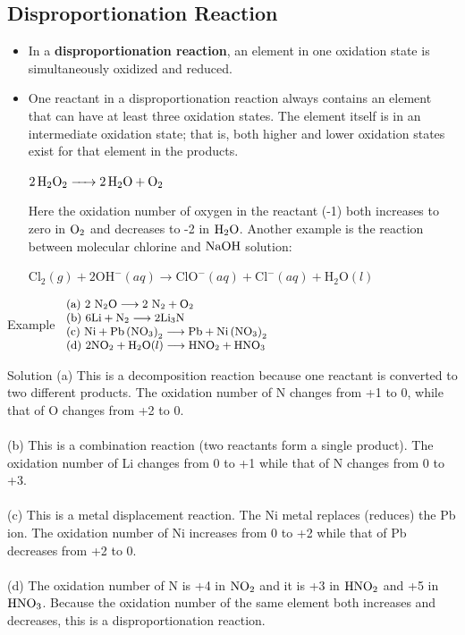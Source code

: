 \documentclass[a4paper,12pt,twocolumn]{article}
\begin{document}
\subsection{Disproportionation Reaction}
\begin{itemize}
\item In a \textbf{disproportionation reaction}, an element in one oxidation state is simultaneously oxidized and reduced.
\item One reactant in a disproportionation reaction always contains an element that can have at least three oxidation states. The element itself is in an intermediate oxidation state; that is, both higher and lower oxidation states exist for that element in the products.

\begin{Box1}{}
$\ce{2H2O2 -> 2H2O + O2}$
\end{Box1}
Here the oxidation number of oxygen in the reactant (-1) both increases to zero in
$\ce{O2}$ and decreases to -2 in $\ce{H2O}$. Another example is the reaction between molecular chlorine and $\ce{NaOH}$ solution:
\begin{Box1}{}
$\mathrm{Cl}_{2}(g)+2 \mathrm{OH}^{-}(a q) \longrightarrow \mathrm{ClO}^{-}(a q)+\mathrm{Cl}^{-}(a q)+\mathrm{H}_{2} \mathrm{O}(l)$
\end{Box1}
\end{itemize}
\begin{Box1}{Example}
$\small{\begin{array}{l}\text{(a) } 2 \mathrm{~N}_{2} \mathrm{O} \longrightarrow 2 \mathrm{~N}_{2}+\mathrm{O}_{2}\\
\text{(b) } 6 \mathrm{Li}+\mathrm{N}_{2} \longrightarrow 2 \mathrm{Li}_{3} \mathrm{N}\\
\text{(c) } \mathrm{Ni}+\mathrm{Pb}\left(\mathrm{NO}_{3}\right)_{2} \longrightarrow  \mathrm{Pb}+\mathrm{Ni}\left(\mathrm{NO}_{3}\right)_{2}\\
\text{(d) } 2 \mathrm{NO}_{2}+\mathrm{H}_{2} \mathrm{O}(l) \longrightarrow  \mathrm{HNO}_{2}+\mathrm{HNO}_{3}
\end{array}}$
\end{Box1}

\begin{Box2}{Solution}
(a) This is a decomposition reaction because one reactant is converted to two
different products. The oxidation number of N changes from +1 to 0, while that of
O changes from +2 to 0.\\
\\
(b) This is a combination reaction (two reactants form a single product). The oxidation
number of Li changes from 0 to +1 while that of N changes from 0 to +3.\\
\\
(c) This is a metal displacement reaction. The Ni metal replaces (reduces) the Pb ion.
The oxidation number of Ni increases from 0 to +2 while that of Pb decreases
from +2 to 0.\\
\\
(d) The oxidation number of N is +4 in $\ce{NO2}$ and it is +3 in $\ce{HNO2}$ and +5 in $\ce{HNO3}$.
Because the oxidation number of the same element both increases and decreases,
this is a disproportionation reaction.
\end{Box2}
\end{document}
